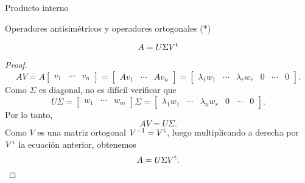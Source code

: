 \begin{chapter}{Producto interno}
\begin{section}{Operadores antisim\'etricos y operadores ortogonales (*)}
        \begin{teorema}
            $$A = U\Sigma V^{{\operatorname{t}}}$$ 
        \end{teorema}
        \begin{proof}
            $$
            AV = A \begin{bmatrix}
            v_1 & \cdots & v_n
            \end{bmatrix}
            =
             \begin{bmatrix}
            Av_1 & \cdots & Av_n
            \end{bmatrix}
            =
            \begin{bmatrix}
            \lambda_1 w_1& \cdots & \lambda_r w_r& 0 &\cdots &0
            \end{bmatrix}.
            $$
            Como $\Sigma$  es diagonal, no es difícil verificar que 
            $$
            U\Sigma = \begin{bmatrix}
            w_1 & \cdots &  w_m
            \end{bmatrix}\Sigma = \begin{bmatrix}
            \lambda_1 w_1& \cdots & \lambda_n w_r& 0 &\cdots &0
            \end{bmatrix}.
            $$
            Por lo tanto,
            $$
            AV = U\Sigma.
            $$
            Como $V$ es una matriz ortogonal $V^{-1}= V^{{\operatorname{t}}}$, luego  multiplicando  a derecha por $V^{{\operatorname{t}}}$ la ecuación anterior, obtenemos
            $$
            A = U\Sigma V^{{\operatorname{t}}}.
            $$    
        \end{proof}
        
    \end{section}



\end{chapter}